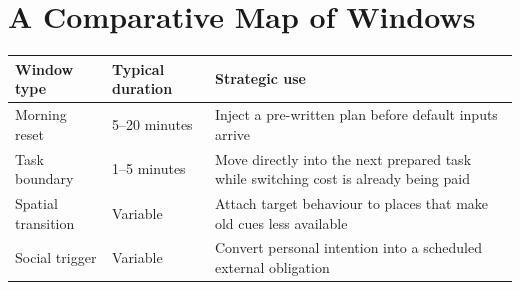 \section{A Comparative Map of Windows}

\begin{center}
\begin{tabularx}{\textwidth}{@{}l l X@{}}
\toprule
Window type & Typical duration & Strategic use \\
\midrule
Morning reset & 5--20 minutes & Inject a pre-written plan before default inputs arrive \\
Task boundary & 1--5 minutes & Move directly into the next prepared task while switching cost is already being paid \\
Spatial transition & Variable & Attach target behaviour to places that make old cues less available \\
Social trigger & Variable & Convert personal intention into a scheduled external obligation \\
\bottomrule
\end{tabularx}
\end{center}
